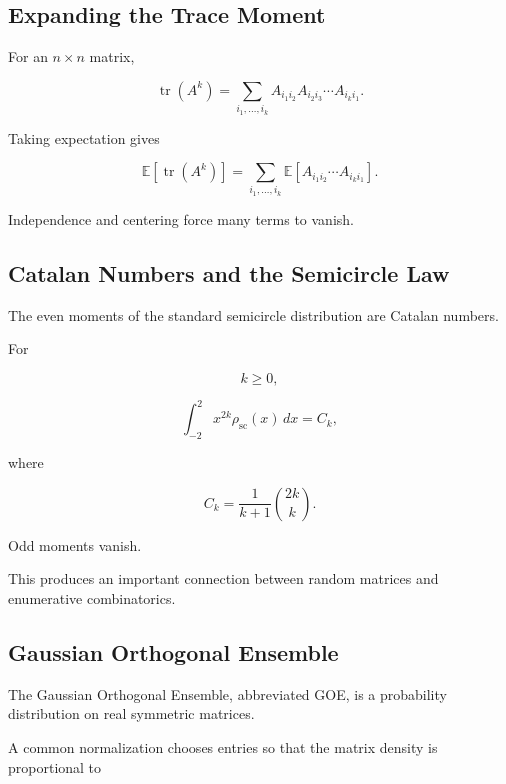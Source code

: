 \subsection{Expanding the Trace Moment}
\label{subsec:trace-moment-expansion}

For an \(n\times n\) matrix,

\[
\operatorname{tr}(A^k)
=
\sum_{i_1,\ldots,i_k}
A_{i_1i_2}
A_{i_2i_3}
\cdots
A_{i_ki_1}.
\]

Taking expectation gives

\[
\boxed{
\mathbb{E}
[
\operatorname{tr}(A^k)
]
=
\sum_{i_1,\ldots,i_k}
\mathbb{E}
[
A_{i_1i_2}\cdots A_{i_ki_1}
].
}
\]

Independence and centering force many terms to vanish.

\subsection{Catalan Numbers and the Semicircle Law}
\label{subsec:catalan-semicircle}

The even moments of the standard semicircle distribution are Catalan
numbers.

For

\[
k\geq0,
\]

\[
\boxed{
\int_{-2}^{2}
x^{2k}
\rho_{\mathrm{sc}}(x)\,dx
=
C_k,
}
\]

where

\[
\boxed{
C_k
=
\frac1{k+1}
\binom{2k}{k}.
}
\]

Odd moments vanish.

This produces an important connection between random matrices and
enumerative combinatorics.

\subsection{Gaussian Orthogonal Ensemble}
\label{subsec:goe}

The Gaussian Orthogonal Ensemble, abbreviated GOE, is a probability
distribution on real symmetric matrices.

A common normalization chooses entries so that the matrix density is
proportional to


